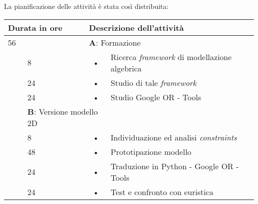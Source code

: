 La pianificazione delle attività è stata così distribuita:
\begin{center}
	\begin{tabular}{|l|l|c l|}
		\hline
		\multicolumn{2}{|l|}{\textbf{Durata in ore}}		&	\multicolumn{2}{l|}{\textbf{Descrizione dell'attività}}\\
		\hline
		\multicolumn{2}{|l|}{56}	&	\multicolumn{2}{l|}{\textbf{A}: Formazione}\\
		\hline
		\multirow{5}{1cm}{ } & 8  & \hspace{5mm}•\hspace{2mm} & Ricerca \textit{framework} di modellazione algebrica \\
		\multirow{5}{1cm}{ } & 24 & \hspace{5mm}•\hspace{2mm} & Studio di tale \textit{framework}                    \\
		\multirow{5}{1cm}{ } & 24 & \hspace{5mm}•\hspace{2mm} & Studio Google OR - Tools                             \\
		\hline
																									
		\multicolumn{2}{|l|}{104}	&	\multicolumn{2}{l|}{\textbf{B}: Versione modello 2D}\\
		\hline
		\multirow{5}{1cm}{ } & 8  & \hspace{5mm}•\hspace{2mm} & Individuazione ed analisi \textit{constraints}       \\
		\multirow{3}{1cm}{ } & 48 & \hspace{5mm}•\hspace{2mm} & Prototipazione modello                               \\
		\multirow{5}{1cm}{ } & 24 & \hspace{5mm}•\hspace{2mm} & Traduzione in Python - Google OR - Tools             \\
		\multirow{5}{1cm}{ } & 24 & \hspace{5mm}•\hspace{2mm} & Test e confronto con euristica                       \\	
		\hline
																									

\end{tabular}
\end{center}

